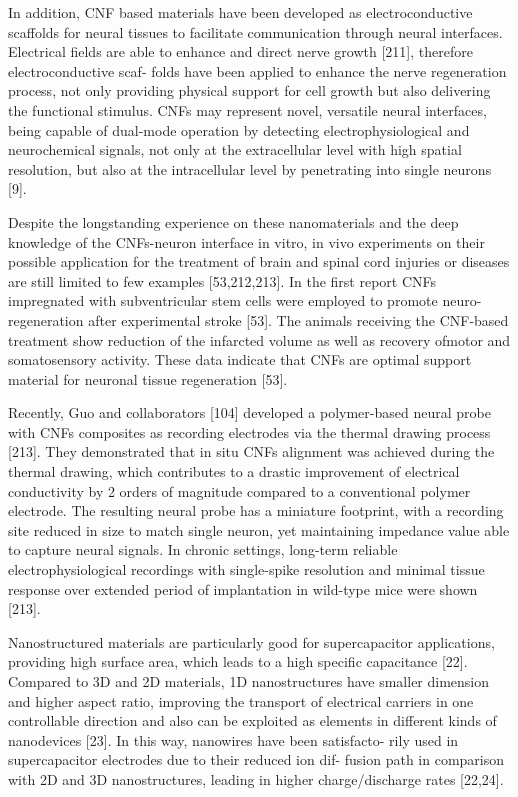 In addition, CNF based materials have been developed as electroconductive scaffolds for neural tissues to facilitate communication through neural interfaces. Electrical fields are able to enhance and direct nerve growth [211], therefore electroconductive scaf- folds have been applied to enhance the nerve regeneration process, not only providing physical support for cell growth but also delivering the functional stimulus. CNFs may represent novel, versatile neural interfaces, being capable of dual-mode operation by detecting electrophysiological and neurochemical signals, not only at the extracellular level with high spatial resolution, but also at the intracellular level by penetrating into single neurons [9].

Despite the longstanding experience on these nanomaterials and the deep knowledge of the CNFs-neuron interface in vitro, in vivo experiments on their possible application for the treatment of brain and spinal cord injuries or diseases are still limited to few examples [53,212,213]. In the first report CNFs impregnated with subventricular stem cells were employed to promote neuro- regeneration after experimental stroke [53]. The animals receiving the CNF-based treatment show reduction of the infarcted volume as well as recovery ofmotor and somatosensory activity. These data indicate that CNFs are optimal support material for neuronal tissue regeneration [53].

Recently, Guo and collaborators [104] developed a polymer-based neural probe with CNFs composites as recording electrodes via the thermal drawing process [213]. They demonstrated that in situ CNFs alignment was achieved during the thermal drawing, which contributes to a drastic improvement of electrical conductivity by 2 orders of magnitude compared to a conventional polymer electrode. The resulting neural probe has a miniature footprint, with a recording site reduced in size to match single neuron, yet maintaining impedance value able to capture neural signals. In chronic settings, long-term reliable electrophysiological recordings with single-spike resolution and minimal tissue response over extended period of implantation in wild-type mice were shown [213].

Nanostructured materials are particularly good for supercapacitor applications, providing high surface area, which leads to a high specific capacitance [22]. Compared to 3D and 2D materials, 1D nanostructures have smaller dimension and higher aspect ratio, improving the transport of electrical carriers in one controllable direction and also can be exploited as elements in different kinds of nanodevices [23]. In this way, nanowires have been satisfacto- rily used in supercapacitor electrodes due to their reduced ion dif- fusion path in comparison with 2D and 3D nanostructures, leading in higher charge/discharge rates [22,24].


